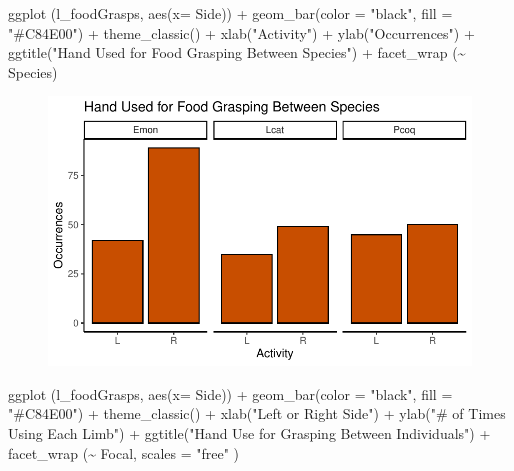 \documentclass[
  letterpaper,
  DIV=11,
  numbers=noendperiod]{scrartcl}
\newenvironment{Shaded}{\begin{snugshade}}{\end{snugshade}}
\newcommand{\AttributeTok}[1]{\textcolor[rgb]{0.40,0.45,0.13}{#1}}
\newcommand{\FunctionTok}[1]{\textcolor[rgb]{0.28,0.35,0.67}{#1}}
\newcommand{\NormalTok}[1]{\textcolor[rgb]{0.00,0.23,0.31}{#1}}
\newcommand{\SpecialCharTok}[1]{\textcolor[rgb]{0.37,0.37,0.37}{#1}}
\newcommand{\StringTok}[1]{\textcolor[rgb]{0.13,0.47,0.30}{#1}}
\begin{document}
\begin{Shaded}
\begin{Highlighting}[]
\FunctionTok{ggplot}\NormalTok{ (l\_foodGrasps, }\FunctionTok{aes}\NormalTok{(}\AttributeTok{x=}\NormalTok{ Side)) }\SpecialCharTok{+}
  \FunctionTok{geom\_bar}\NormalTok{(}\AttributeTok{color =} \StringTok{"black"}\NormalTok{, }\AttributeTok{fill =} \StringTok{"\#C84E00"}\NormalTok{) }\SpecialCharTok{+}
  \FunctionTok{theme\_classic}\NormalTok{() }\SpecialCharTok{+}
  \FunctionTok{xlab}\NormalTok{(}\StringTok{"Activity"}\NormalTok{) }\SpecialCharTok{+}
  \FunctionTok{ylab}\NormalTok{(}\StringTok{"Occurrences"}\NormalTok{) }\SpecialCharTok{+}
  \FunctionTok{ggtitle}\NormalTok{(}\StringTok{"Hand Used for Food Grasping Between Species"}\NormalTok{) }\SpecialCharTok{+}
  \FunctionTok{facet\_wrap}\NormalTok{ (}\SpecialCharTok{\textasciitilde{}}\NormalTok{ Species)}
\end{Highlighting}
\end{Shaded}

\begin{figure}[H]

{\centering \includegraphics{LeftyLemurs_files/figure-pdf/unnamed-chunk-35-1.pdf}

}

\end{figure}

\begin{Shaded}
\begin{Highlighting}[]
\FunctionTok{ggplot}\NormalTok{ (l\_foodGrasps, }\FunctionTok{aes}\NormalTok{(}\AttributeTok{x=}\NormalTok{ Side)) }\SpecialCharTok{+}
  \FunctionTok{geom\_bar}\NormalTok{(}\AttributeTok{color =} \StringTok{"black"}\NormalTok{, }\AttributeTok{fill =} \StringTok{"\#C84E00"}\NormalTok{) }\SpecialCharTok{+}
  \FunctionTok{theme\_classic}\NormalTok{() }\SpecialCharTok{+}
  \FunctionTok{xlab}\NormalTok{(}\StringTok{"Left or Right Side"}\NormalTok{) }\SpecialCharTok{+}
  \FunctionTok{ylab}\NormalTok{(}\StringTok{"\# of Times Using Each Limb"}\NormalTok{) }\SpecialCharTok{+}
  \FunctionTok{ggtitle}\NormalTok{(}\StringTok{"Hand Use for Grasping Between Individuals"}\NormalTok{) }\SpecialCharTok{+}
  \FunctionTok{facet\_wrap}\NormalTok{ (}\SpecialCharTok{\textasciitilde{}}\NormalTok{ Focal, }\AttributeTok{scales =} \StringTok{"free"}\NormalTok{ )}
\end{Highlighting}
\end{Shaded}
\end{document}
